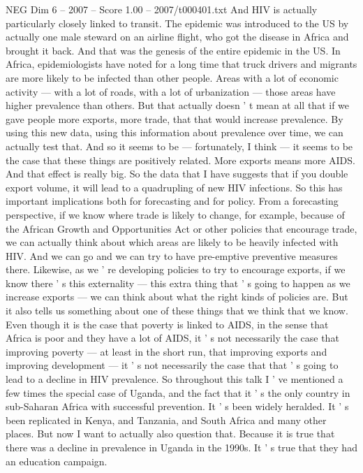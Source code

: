 \begin{textsample}{NEG Dim 6 – 2007 – Score 1.00 – 2007/t000401.txt}
And HIV is actually particularly closely linked to transit.
The epidemic was introduced to the US by actually one male steward on an airline flight, who got the disease in Africa and brought it back.
And that was the genesis of the entire epidemic in the US.
In Africa, epidemiologists have noted for a long time that truck drivers and migrants are more likely to be infected than other people.
Areas with a lot of economic activity — with a lot of roads, with a lot of urbanization — those areas have higher prevalence than others.
But that actually doesn ' t mean at all that if we gave people more exports, more trade, that that would increase prevalence.
By using this new data, using this information about prevalence over time, we can actually test that.
And so it seems to be — fortunately, I think — it seems to be the case that these things are positively related.
More exports means more AIDS.
And that effect is really big.
So the data that I have suggests that if you double export volume, it will lead to a quadrupling of new HIV infections.
So this has important implications both for forecasting and for policy.
From a forecasting perspective, if we know where trade is likely to change, for example, because of the African Growth and Opportunities Act or other policies that encourage trade, we can actually think about which areas are likely to be heavily infected with HIV.
And we can go and we can try to have pre-emptive preventive measures there.
Likewise, as we ' re developing policies to try to encourage exports, if we know there ' s this externality — this extra thing that ' s going to happen as we increase exports — we can think about what the right kinds of policies are.
But it also tells us something about one of these things that we think that we know.
Even though it is the case that poverty is linked to AIDS, in the sense that Africa is poor and they have a lot of AIDS, it ' s not necessarily the case that improving poverty — at least in the short run, that improving exports and improving development — it ' s not necessarily the case that that ' s going to lead to a decline in HIV prevalence.
So throughout this talk I ' ve mentioned a few times the special case of Uganda, and the fact that it ' s the only country in sub-Saharan Africa with successful prevention.
It ' s been widely heralded.
It ' s been replicated in Kenya, and Tanzania, and South Africa and many other places.
But now I want to actually also question that.
Because it is true that there was a decline in prevalence in Uganda in the 1990s.
It ' s true that they had an education campaign.

\end{textsample}

